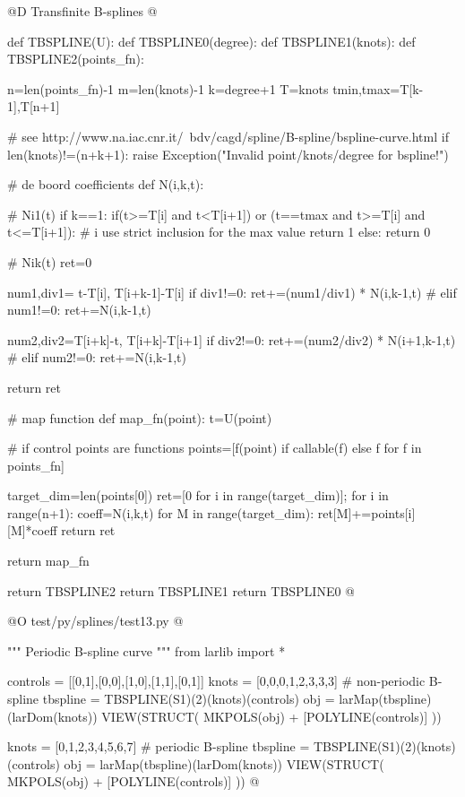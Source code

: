 \documentclass[11pt,oneside]{article}	%
\begin{document}
@D Transfinite B-splines
@{
def TBSPLINE(U):
	def TBSPLINE0(degree):
		def TBSPLINE1(knots):
			def TBSPLINE2(points_fn):
	
				n=len(points_fn)-1
				m=len(knots)-1
				k=degree+1
				T=knots
				tmin,tmax=T[k-1],T[n+1]
	
				# see http://www.na.iac.cnr.it/~bdv/cagd/spline/B-spline/bspline-curve.html
				if len(knots)!=(n+k+1):
					raise Exception("Invalid point/knots/degree for bspline!")
	
				# de boord coefficients
				def N(i,k,t):
	
					# Ni1(t)
					if k==1: 
						if(t>=T[i] and t<T[i+1]) or (t==tmax and t>=T[i] and t<=T[i+1]): 
							# i use strict inclusion for the max value
							return 1
						else:
							return 0
	
					# Nik(t)
					ret=0
	
					num1,div1= t-T[i], T[i+k-1]-T[i]  
					if div1!=0: ret+=(num1/div1) * N(i,k-1,t)
					# elif num1!=0: ret+=N(i,k-1,t)
	
					num2,div2=T[i+k]-t, T[i+k]-T[i+1]
					if div2!=0:  ret+=(num2/div2) * N(i+1,k-1,t)
					# elif num2!=0: ret+=N(i,k-1,t)
	
					return ret
	
				# map function
				def map_fn(point):
					t=U(point)
	
					# if control points are functions
					points=[f(point) if callable(f) else f for f in points_fn]
	
					target_dim=len(points[0])
					ret=[0 for i in range(target_dim)];
					for i in range(n+1):
						coeff=N(i,k,t) 
						for M in range(target_dim):
							ret[M]+=points[i][M]*coeff
					return ret
	
				return map_fn
	
			return TBSPLINE2
		return TBSPLINE1
	return TBSPLINE0
@}


@O test/py/splines/test13.py
@{""" Periodic B-spline curve """
from larlib import *

controls = [[0,1],[0,0],[1,0],[1,1],[0,1]]
knots = [0,0,0,1,2,3,3,3]				# non-periodic B-spline
tbspline = TBSPLINE(S1)(2)(knots)(controls)
obj = larMap(tbspline)(larDom(knots))  
VIEW(STRUCT( MKPOLS(obj) + [POLYLINE(controls)] ))

knots = [0,1,2,3,4,5,6,7]				# periodic B-spline
tbspline = TBSPLINE(S1)(2)(knots)(controls) 	
obj = larMap(tbspline)(larDom(knots))
VIEW(STRUCT( MKPOLS(obj) + [POLYLINE(controls)] ))
@}
\end{document}
